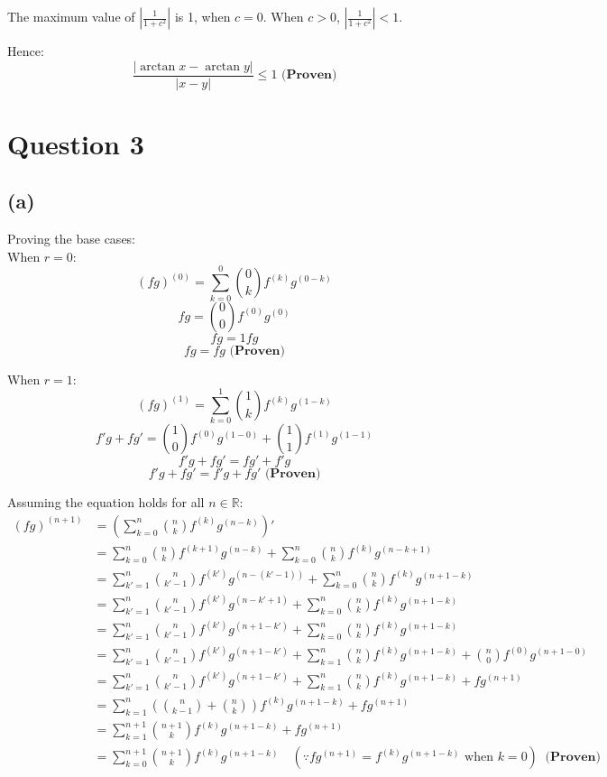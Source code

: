 \documentclass[11pt]{article}
\begin{document}
The maximum value of \(\left| \frac{1}{1 + c^2}\right|\) is 1, when \(c = 0\). When \(c > 0\), \(\left| \frac{1}{1 + c^2} \right| < 1\).

Hence:
\[\frac{|\arctan x - \arctan y|}{|x - y|} \le 1 \textbf{ (Proven)}\]

\newpage

\section{Question 3}
\label{sec:orga19c326}

\subsection{(a)}
\label{sec:org6ffc018}

Proving the base cases:
\\[0pt]

When \(r = 0\):
\[(fg)^{(0)} = \sum_{k = 0}^{0} {0 \choose k} f^{(k)} g^{(0 - k)}\]
\[fg = {0 \choose 0} f^{(0)} g^{(0)}\]
\[fg = 1 f g\]
\[fg = fg \textbf{ (Proven)}\]

When \(r = 1\):
\[(fg)^{(1)} = \sum_{k = 0}^{1} {1 \choose k} f^{(k)} g^{(1 - k)}\]
\[f'g + fg' = {1 \choose 0} f^{(0)} g^{(1 - 0)} + {1 \choose 1} f^{(1)} g^{(1 - 1)}\]
\[f'g + fg' = fg' + f'g\]
\[f'g + fg' = f'g + fg' \textbf{ (Proven)}\]

Assuming the equation holds for all \(n \in \mathbb{R}\):
\begin{align*}
(fg)^{(n + 1)} &= \left(\sum_{k = 0}^{n} {n \choose k} f^{(k)} g^{(n - k)}\right)' \\
&= \sum_{k = 0}^{n} {n \choose k} f^{(k + 1)} g^{(n - k)} + \sum_{k = 0}^{n} {n \choose k} f^{(k)} g^{(n - k + 1)} \\
&= \sum_{k' = 1}^{n} {n \choose k' - 1} f^{(k')} g^{(n - (k' - 1))} + \sum_{k = 0}^{n} {n \choose k} f^{(k)} g^{(n + 1 - k)} \\
&= \sum_{k' = 1}^{n} {n \choose k' - 1} f^{(k')} g^{(n - k' + 1)} + \sum_{k = 0}^{n} {n \choose k} f^{(k)} g^{(n + 1 - k)} \\
&= \sum_{k' = 1}^{n} {n \choose k' - 1} f^{(k')} g^{(n + 1 - k')} + \sum_{k = 0}^{n} {n \choose k} f^{(k)} g^{(n + 1 - k)} \\
&= \sum_{k' = 1}^{n} {n \choose k' - 1} f^{(k')} g^{(n + 1 - k')} + \sum_{k = 1}^{n} {n \choose k} f^{(k)} g^{(n + 1 - k)} + {n \choose 0} f^{(0)} g^{(n + 1 - 0)} \\
&= \sum_{k' = 1}^{n} {n \choose k' - 1} f^{(k')} g^{(n + 1 - k')} + \sum_{k = 1}^{n} {n \choose k} f^{(k)} g^{(n + 1 - k)} + f g^{(n + 1)} \\
&= \sum_{k = 1}^{n} \left( {n \choose k - 1} + {n \choose k} \right) f^{(k)} g^{(n + 1 - k)} + f g^{(n + 1)} \\
&= \sum_{k = 1}^{n + 1} {n + 1 \choose k} f^{(k)} g^{(n + 1 - k)} + f g^{(n + 1)} \\
&= \sum_{k = 0}^{n + 1} {n + 1 \choose k} f^{(k)} g^{(n + 1 - k)} \quad (\because fg^{(n + 1)} = f^{(k)} g^{(n + 1 - k)} \text{ when } k = 0) \ \textbf{ (Proven)} \\
\end{align*}
\end{document}
